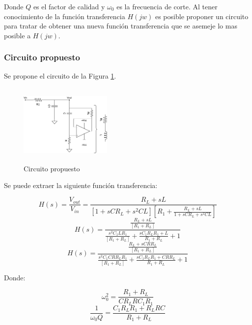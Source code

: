 \documentclass[12pt,a4paper]{article}
\begin{document}
Donde $Q$ es el factor de calidad y $\omega_0$ es la frecuencia de corte.      
Al tener conocimiento de la función transferencia $H(jw)$ es posible proponer un circuito para tratar de obtener una nueva función transferencia que se asemeje lo mas posible a $H(jw)$. 

\subsubsection{Circuito propuesto}
Se propone el circuito de la Figura \ref{fig:ej2_BP_propuesto}. 

\begin{figure}[!]                                                       
    \centering\includegraphics[width=0.4\textwidth, height=4cm]{Resources/ej2_bp_gyrator.png}
    \caption{Circuito propuesto}
    \label{fig:ej2_BP_propuesto}
    \end{figure}

Se puede extraer la siguiente función transferencia:

\begin{displaymath} H(s)= \frac{V_{out}}{V_{in}} = \frac{R_L + sL}{[1+sC R_L + s^2 C L] [R_1 + \frac{R_L + sL}{1 + sCR_L + s^2 C L}]} \end{displaymath}  
\begin{displaymath} H(s)= \frac{\frac{R_L + sL}{[R_1 + R_L]}}{\frac{s^2 C_1 L R_1}{[R_1 + R_L]} + \frac{s C_1 R_L R_1 + L}{R_1 + R_L} +1} \end{displaymath}
\begin{displaymath} H(s)= \frac{\frac{R_L + sCR R_L}{[R_1 + R_L]}}{\frac{s^2 C_1 CR R_L R_1}{[R_1 + R_L]} + \frac{s C_1 R_L R_1 + CR R_L}{R_1 + R_L} +1} \end{displaymath}

Donde:

\begin{displaymath} \omega_0^2= \frac{R_1 + R_L}{CR_LRC_1 R_1} \end{displaymath}  
\begin{displaymath} \frac{1}{\omega_0 Q}= \frac{C_1 R_L R_1 + R_L R C}{R_1 + R_L} \end{displaymath}  
\end{document}
